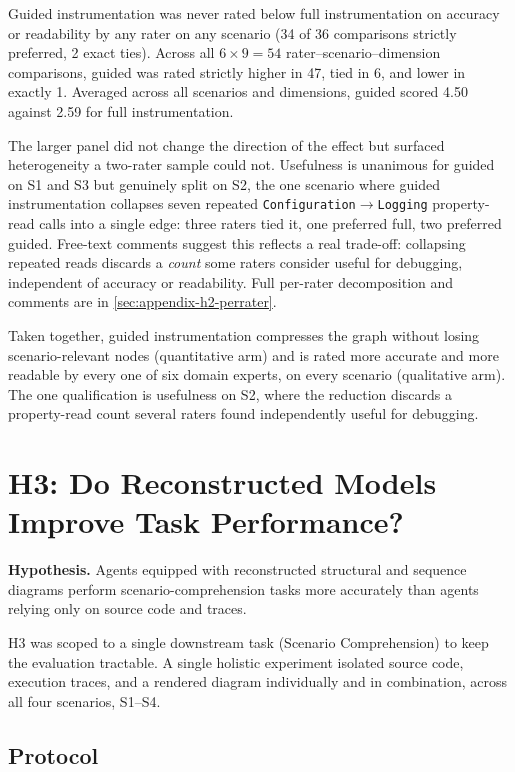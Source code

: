 Guided instrumentation was never rated below full instrumentation on
accuracy or readability by any rater on any scenario (34 of 36
comparisons strictly preferred, 2 exact ties). Across all
$6 \times 9 = 54$ rater--scenario--dimension comparisons, guided was
rated strictly higher in 47, tied in 6, and lower in exactly 1. Averaged
across all scenarios and dimensions, guided scored 4.50 against 2.59 for
full instrumentation.

The larger panel did not change the direction of the effect but
surfaced heterogeneity a two-rater sample could not. Usefulness is
unanimous for guided on S1 and S3 but genuinely split on S2, the one
scenario where guided instrumentation collapses seven repeated
\texttt{Configuration}$\to$\texttt{Logging} property-read calls into a
single edge: three raters tied it, one preferred full, two preferred
guided. Free-text comments suggest this reflects a real trade-off:
collapsing repeated reads discards a \emph{count} some raters consider
useful for debugging, independent of accuracy or readability. Full
per-rater decomposition and comments are in
\cref{sec:appendix-h2-perrater}.

Taken together, guided instrumentation compresses the graph without
losing scenario-relevant nodes (quantitative arm) and is rated more
accurate and more readable by every one of six domain experts, on every
scenario (qualitative arm). The one qualification is usefulness on S2,
where the reduction discards a property-read count several raters found
independently useful for debugging.

\section{H3: Do Reconstructed Models Improve Task Performance?}\label{sec:h3}

\textbf{Hypothesis.} Agents equipped with reconstructed structural and
sequence diagrams perform scenario-comprehension tasks more accurately
than agents relying only on source code and traces.

H3 was scoped to a single downstream task (Scenario Comprehension) to
keep the evaluation tractable. A single holistic experiment isolated
source code, execution traces, and a rendered diagram individually and
in combination, across all four scenarios, S1--S4.

\subsection{Protocol}

